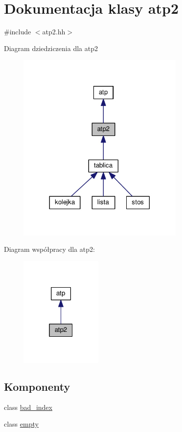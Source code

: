 \hypertarget{classatp2}{}\section{Dokumentacja klasy atp2}
\label{classatp2}


{\ttfamily \#include $<$atp2.\+hh$>$}



Diagram dziedziczenia dla atp2\nopagebreak
\begin{figure}[H]
\begin{center}
\leavevmode
\includegraphics[width=233pt]{classatp2__inherit__graph}
\end{center}
\end{figure}


Diagram współpracy dla atp2\+:\nopagebreak
\begin{figure}[H]
\begin{center}
\leavevmode
\includegraphics[width=115pt]{classatp2__coll__graph}
\end{center}
\end{figure}
\subsection*{Komponenty}
\begin{DoxyCompactItemize}
\item 
class \hyperlink{classatp2_1_1bad__index}{bad\+\_\+index}
\item 
class \hyperlink{classatp2_1_1empty}{empty}
\end{DoxyCompactItemize}
